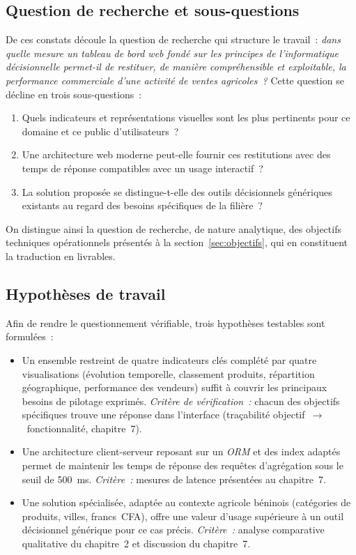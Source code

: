 \documentclass[11pt,a4paper]{report}
\begin{document}
\subsection{Question de recherche et sous-questions}
De ces constats découle la question de recherche qui structure le travail~:
\emph{dans quelle mesure un tableau de bord web fondé sur les principes de
l'informatique décisionnelle permet-il de restituer, de manière compréhensible
et exploitable, la performance commerciale d'une activité de ventes agricoles~?}
Cette question se décline en trois sous-questions~:
\begin{enumerate}
  \item Quels indicateurs et représentations visuelles sont les plus pertinents
        pour ce domaine et ce public d'utilisateurs~?
  \item Une architecture web moderne peut-elle fournir ces restitutions avec des
        temps de réponse compatibles avec un usage interactif~?
  \item La solution proposée se distingue-t-elle des outils décisionnels
        génériques existants au regard des besoins spécifiques de la filière~?
\end{enumerate}
On distingue ainsi la question de recherche, de nature analytique, des objectifs
techniques opérationnels présentés à la section~\ref{sec:objectifs}, qui en
constituent la traduction en livrables.

\subsection{Hypothèses de travail}
\label{sec:hypotheses}
Afin de rendre le questionnement vérifiable, trois hypothèses testables sont
formulées~:
\begin{itemize}
  \item[\textbf{H1}] Un ensemble restreint de quatre indicateurs clés complété
        par quatre visualisations (évolution temporelle, classement produits,
        répartition géographique, performance des vendeurs) suffit à couvrir les
        principaux besoins de pilotage exprimés. \emph{Critère de vérification~:}
        chacun des objectifs spécifiques trouve une réponse dans l'interface
        (traçabilité objectif~$\rightarrow$~fonctionnalité, chapitre~7).
  \item[\textbf{H2}] Une architecture client-serveur reposant sur un
        \emph{ORM} et des index adaptés permet de maintenir les temps de réponse
        des requêtes d'agrégation sous le seuil de 500~ms. \emph{Critère~:}
        mesures de latence présentées au chapitre~7.
  \item[\textbf{H3}] Une solution spécialisée, adaptée au contexte agricole
        béninois (catégories de produits, villes, francs~CFA), offre une valeur
        d'usage supérieure à un outil décisionnel générique pour ce cas précis.
        \emph{Critère~:} analyse comparative qualitative du chapitre~2 et
        discussion du chapitre~7.
\end{itemize}
\end{document}
